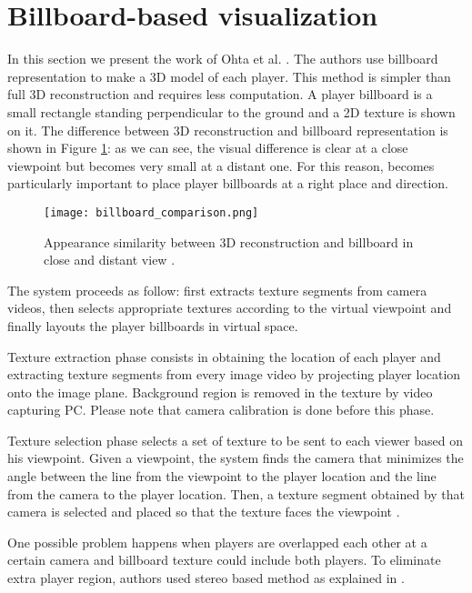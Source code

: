 \section{Billboard-based visualization}
In this section we present the work of Ohta et al. \cite{03_billboard}.
The authors use billboard representation to make a 3D model of each player.
This method is simpler than full 3D reconstruction and requires less computation.
A player billboard is a small rectangle standing perpendicular to the ground
and a 2D texture is shown on it.
The difference between 3D reconstruction and billboard representation is shown in Figure \ref{fig:billboard_comparison}:
as we can see, the visual difference is clear at a close viewpoint but becomes very small at a distant one.
For this reason, becomes particularly important to place player billboards at a right place and direction.

\begin{figure}[htbp]
\centerline{\texttt{[image: billboard\_comparison.png]}}
\caption{Appearance similarity between 3D reconstruction and billboard in close and distant view \cite{03_billboard}.}
\label{fig:billboard_comparison}
\end{figure}


The system proceeds as follow: first extracts texture segments from camera videos, then selects appropriate textures according
to the virtual viewpoint and finally layouts the player billboards in virtual space.

Texture extraction phase consists in obtaining the location of each player and extracting texture segments from every image 
video by projecting player location onto the image plane.
Background region is removed in the texture by video capturing PC.
Please note that camera calibration is done before this phase.

Texture selection phase selects a set of texture to be sent to each viewer based on his viewpoint. 
Given a viewpoint, the system finds the camera that minimizes the angle between the line from the viewpoint to the player 
location and the line from the camera to the player location. Then, a texture segment obtained by that camera is selected 
and placed so that the texture faces the viewpoint \cite{03_billboard}.


One possible problem happens when players are overlapped each other at a certain camera and billboard texture could include both
players.
To eliminate extra player region, authors used stereo based method \cite{03_billboard_04} as explained in \cite{03_billboard}. 

